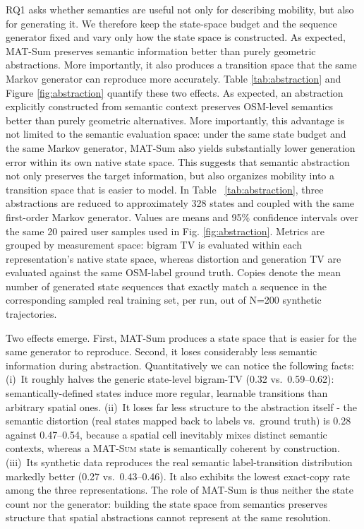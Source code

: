 \documentclass[sigconf,nonacm]{acmart}
\begin{document}
RQ1 asks whether semantics are useful not only for describing mobility, but also for generating it. We therefore keep the state-space budget and the sequence generator fixed and vary only how the state
space is constructed. As expected, MAT-Sum preserves semantic information better than purely geometric abstractions. More importantly, it also produces a transition space that the same Markov
generator can reproduce more accurately. Table \ref{tab:abstraction} and Figure \ref{fig:abstraction}
quantify these two effects. As expected, an abstraction explicitly constructed from semantic context preserves OSM-level semantics better than purely geometric alternatives. More importantly, this advantage is not limited to the semantic evaluation space: under the same state budget and the same Markov generator, MAT-Sum also yields substantially lower generation error within its own native state space. This suggests that semantic abstraction not only preserves the target information, but also organizes mobility into a transition space that is easier to model.
In Table ~\ref{tab:abstraction}, three abstractions are reduced to approximately 328 states and coupled with the same first-order Markov generator. Values are means and 95\% confidence intervals over the same 20 paired user samples used in Fig. \ref{fig:abstraction}. Metrics are grouped by measurement space: bigram TV is evaluated within each representation’s native state space, whereas distortion and generation TV are evaluated against the same OSM-label ground truth. Copies denote the mean number of generated state sequences that exactly match a sequence in the corresponding sampled real training set, per run, out of N=200 synthetic trajectories. 

Two effects emerge. First, MAT-Sum produces a state space that is easier for the same generator to reproduce. Second, it loses considerably less semantic information during abstraction.
Quantitatively we can notice  the following facts: 
(i)~It roughly halves the generic state-level bigram-TV (0.32 vs.\
0.59--0.62): semantically-defined states induce more regular, learnable transitions than arbitrary
spatial ones. (ii)~It loses far less structure to the abstraction itself - the semantic
distortion (real states mapped back to labels vs.\ ground truth) is 0.28 against 0.47--0.54,
because a spatial cell inevitably mixes distinct semantic contexts, whereas a \textsc{MAT-Sum} state is
semantically coherent by construction. (iii)~Its synthetic data reproduces the real semantic label-transition distribution markedly better (0.27 vs.\ 0.43--0.46). It also exhibits the lowest exact-copy rate among the three representations. The role of MAT-Sum is thus neither the state count nor the generator: building the state space from semantics preserves structure that spatial abstractions cannot represent at the same resolution.
\end{document}
